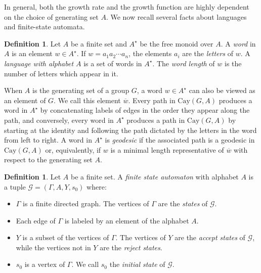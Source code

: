 \documentclass[11pt,letterpaper]{amsart}
\theoremstyle{definition}
\newtheorem{definition}[theorem]{Definition}
\theoremstyle{plain}
\theoremstyle{TheoremNum}
\begin{document}
In general, both the growth rate and the growth function are highly dependent on the choice of generating set $A$. We now recall several facts about languages and finite-state automata.
\begin{definition}
    Let $A$ be a finite set and $A^{\star}$ be the free monoid over $A$. A \emph{word} in $A$ is an element $w \in A^{\star}$. If $w = a_1 a_2 \cdots a_n$, the elements $a_i$ are the \emph{letters} of $w$. A \emph{language with alphabet $A$} is a set of words in $A^{\star}$. The \emph{word length} of $w$ is the number of letters which appear in it.
\end{definition}

When $A$ is the generating set of a group $G$, a word $w \in A^{\star}$ can also be viewed as an element of $G$. We call this element $\overline{w}$. Every path in $\text{Cay}(G,A)$ produces a word in $A^{\star}$ by concatenating labels of edges in the order they appear along the path, and conversely, every word in $A^{\star}$ produces a path in $\text{Cay}(G,A)$ by starting at the identity and following the path dictated by the letters in the word from left to right. A word in $A^{\star}$ is \emph{geodesic} if the associated path is a geodesic in $\text{Cay}(G,A)$ or, equivalently, if $w$ is a minimal length representative of $\overline{w}$ with respect to the generating set $A$. 

\begin{definition}
    Let $A$ be a finite set. A \emph{finite state automaton} with alphabet $A$ is a tuple $\mathcal{G} = (\Gamma, A, Y, s_0)$ where:
    \begin{itemize}
        \item $\Gamma$ is a finite directed graph. The vertices of $\Gamma$ are the \emph{states} of $\mathcal{G}$.
        \item Each edge of $\Gamma$ is labeled by an element of the alphabet $A$.
        \item $Y$ is a subset of the vertices of $\Gamma$. The vertices of $Y$ are the \emph{accept states} of $\mathcal{G}$, while the vertices not in $Y$ are the \emph{reject states}.
        \item $s_0$ is a vertex of $\Gamma$. We call $s_0$ the \emph{initial state} of $\mathcal{G}$.
    \end{itemize}
\end{definition}
\end{document}
